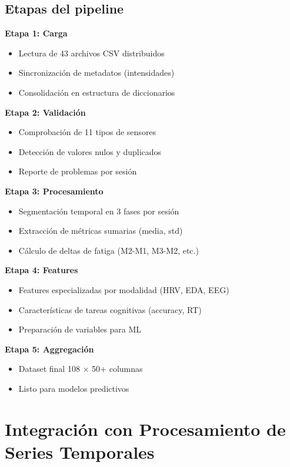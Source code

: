 \documentclass[12pt,a4paper]{article}
\begin{document}
\subsection{Etapas del pipeline}

\textbf{Etapa 1: Carga}
\begin{itemize}
    \item Lectura de 43 archivos CSV distribuidos
    \item Sincronización de metadatos (intensidades)
    \item Consolidación en estructura de diccionarios
\end{itemize}

\textbf{Etapa 2: Validación}
\begin{itemize}
    \item Comprobación de 11 tipos de sensores
    \item Detección de valores nulos y duplicados
    \item Reporte de problemas por sesión
\end{itemize}

\textbf{Etapa 3: Procesamiento}
\begin{itemize}
    \item Segmentación temporal en 3 fases por sesión
    \item Extracción de métricas sumarias (media, std)
    \item Cálculo de deltas de fatiga (M2-M1, M3-M2, etc.)
\end{itemize}

\textbf{Etapa 4: Features}
\begin{itemize}
    \item Features especializadas por modalidad (HRV, EDA, EEG)
    \item Características de tareas cognitivas (accuracy, RT)
    \item Preparación de variables para ML
\end{itemize}

\textbf{Etapa 5: Aggregación}
\begin{itemize}
    \item Dataset final 108 × 50+ columnas
    \item Listo para modelos predictivos
\end{itemize}

\section{Integración con Procesamiento de Series Temporales}
\end{document}
